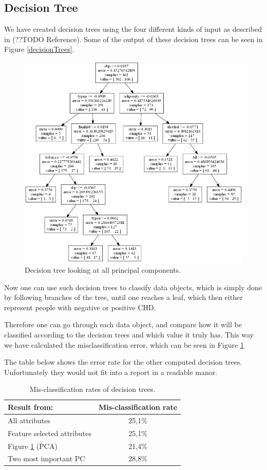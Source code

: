 \subsection{Decision Tree}

We have created decision trees using the four different kinds of input as described in (??TODO Reference). Some of the output of these decision trees can be seen in Figure \ref{decisionTrees}.

\begin{figure}[H]
\center
	\includegraphics[scale=0.25]{pictures/Decision_Tree_XPC.png}
	\caption{Decision tree looking at all principal components.}
	\label{decisionTreeXPA}
\end{figure}

Now one can use such decision trees to classify data objects, which is simply done by following branches of the tree, until one reaches a leaf, which then either represent people with negative or positive CHD.

Therefore one can go through each data object, and compare how it will be classified according to the decision trees and which value it truly has. This way we have calculated the misclassification error, which can be seen in Figure \ref{decisionTreeErrorRate}

The table below shows the error rate for the other computed decision trees. Unfortunately they would not fit into a report in a readable manor.
\begin{table}[H]
\begin{longtable}{lc}\hline
Result from: & Mis-classification rate \\ \hline
All attributes & 25,1\% \\ 
Feature selected attributes & 25,1\% \\ 
Figure \ref{decisionTreeXPA} (PCA) & 21,4\% \\ 
Two most important PC & 28,8\% \\ \hline
\end{longtable}
\caption{Mis-classification rates of decision trees.}
\label{decisionTreeErrorRate}
\end{table}

